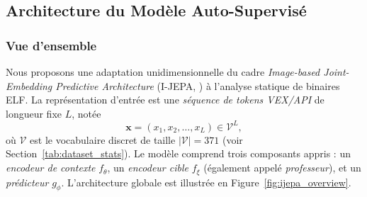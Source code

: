 \subsection{Architecture du Modèle Auto-Supervisé}
\label{sub:method}
 
\subsubsection{Vue d'ensemble}
 
Nous proposons une adaptation unidimensionnelle du cadre
\emph{Image-based Joint-Embedding Predictive Architecture}
(I-JEPA, \cite{assran2023self}) à l'analyse statique de
binaires ELF. La représentation d'entrée est une \emph{séquence
de tokens VEX/API} de longueur fixe $L$, notée
\[
  \bm{x} = (x_1, x_2, \ldots, x_L) \in \mathcal{V}^{L},
\]
où $\mathcal{V}$ est le vocabulaire discret de taille $|\mathcal{V}|
= 371$ (voir Section~\ref{tab:dataset_stats}).
Le modèle comprend trois composants appris : un \emph{encodeur de
contexte} $f_\theta$, un \emph{encodeur cible} $f_\xi$ (également
appelé \emph{professeur}), et un \emph{prédicteur} $g_\phi$.
L'architecture globale est illustrée en Figure~\ref{fig:ijepa_overview}.
 
